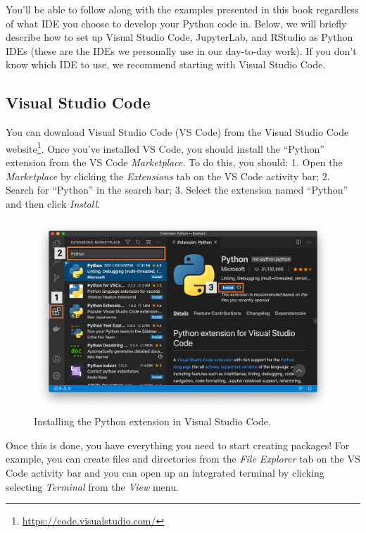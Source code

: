 \documentclass[
]{krantz}
\renewcommand{\href}[2]{#2\footnote{\url{#1}}}
\begin{document}
You'll be able to follow along with the examples presented in this book regardless of what IDE you choose to develop your Python code in. Below, we will briefly describe how to set up Visual Studio Code, JupyterLab, and RStudio as Python IDEs (these are the IDEs we personally use in our day-to-day work). If you don't know which IDE to use, we recommend starting with Visual Studio Code.

\hypertarget{visual-studio-code}{%
\subsection{Visual Studio Code}\label{visual-studio-code}}

You can download Visual Studio Code (VS Code) from \href{https://code.visualstudio.com/}{the Visual Studio Code website}. Once you've installed VS Code, you should install the ``Python'' extension from the VS Code \emph{Marketplace}. To do this, you should:
1. Open the \emph{Marketplace} by clicking the \emph{Extensions} tab on the VS Code activity bar;
2. Search for ``Python'' in the search bar;
3. Select the extension named ``Python'' and then click \emph{Install}.

\begin{figure}

{\centering \includegraphics[width=1\linewidth]{../images/vscode-1} 

}

\caption{Installing the Python extension in Visual Studio Code.}\label{fig:02-vscode-1}
\end{figure}

Once this is done, you have everything you need to start creating packages! For example, you can create files and directories from the \emph{File Explorer} tab on the VS Code activity bar and you can open up an integrated terminal by clicking selecting \emph{Terminal} from the \emph{View} menu.
\end{document}
